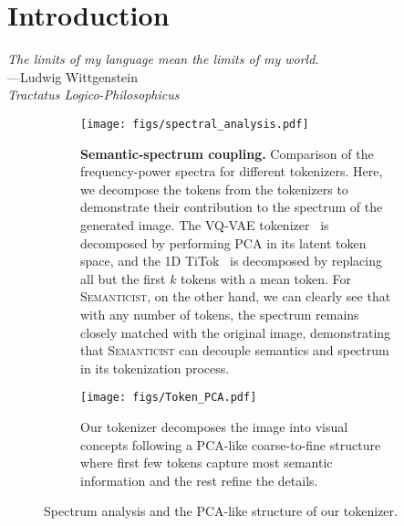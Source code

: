 \documentclass[10pt,twocolumn,letterpaper]{article}
\DeclareRobustCommand{\modelname}{\textsc{Semanticist}\xspace}
\begin{document}
\section{Introduction}



\begin{flushright}
\textit{The limits of my language mean the limits of my world.}\\\vspace{.2em}
---Ludwig Wittgenstein\\\vspace{.2em}
\textit{Tractatus Logico-Philosophicus}
\end{flushright}

\begin{figure*}[t]
\centering
\begin{subfigure}[b]{0.77\textwidth}
    \centering
    \texttt{[image: figs/spectral\_analysis.pdf]}
    \caption{
    \textbf{Semantic-spectrum coupling.} Comparison of the frequency-power spectra for different tokenizers. Here, we decompose the tokens from the tokenizers to demonstrate their contribution to the spectrum of the generated image. 
    The VQ-VAE tokenizer~\cite{llamagen} is decomposed by performing PCA in its latent token space, and the 1D TiTok~\cite{titok} is decomposed by replacing all but the first $k$ tokens with a mean token.
    For \modelname, on the other hand, we can clearly see that with any number of tokens, the spectrum remains closely matched with the original image, demonstrating that \modelname can decouple semantics and spectrum in its tokenization process.
    }
    \label{fig:spectral_analysis}
\end{subfigure}\hfill
\begin{subfigure}[b]{0.215\textwidth}
    \centering
    \texttt{[image: figs/Token\_PCA.pdf]}
    \caption{Our tokenizer decomposes the image into visual concepts following a PCA-like coarse-to-fine structure where first few tokens capture most semantic information and the rest refine the details.}
    \label{fig:PCA_structure}
\end{subfigure}
\caption{Spectrum analysis and the PCA-like structure of our tokenizer.}
\end{figure*}
\end{document}

